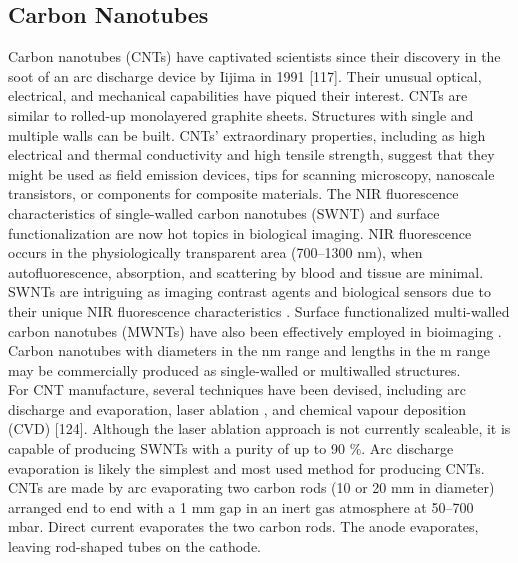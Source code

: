 \documentclass[12pt]{article}
\begin{document}
\subsection*{Carbon Nanotubes} 
Carbon nanotubes (CNTs) have captivated scientists since their discovery in the soot of an arc discharge device by Iijima in 1991 [117]. Their unusual optical, electrical, and mechanical capabilities have piqued their interest. CNTs are similar to rolled-up monolayered graphite sheets. Structures with single and multiple walls can be built. CNTs' extraordinary properties, including as high electrical and thermal conductivity and high tensile strength, suggest that they might be used as field emission devices, tips for scanning microscopy, nanoscale transistors, or components for composite materials. The NIR fluorescence characteristics of single-walled carbon nanotubes (SWNT) and surface functionalization are now hot topics in biological imaging. NIR fluorescence occurs in the physiologically transparent area (700–1300 nm), when autofluorescence, absorption, and scattering by blood and tissue are minimal. SWNTs are intriguing as imaging contrast agents  and biological sensors  due to their unique NIR fluorescence characteristics . Surface functionalized multi-walled carbon nanotubes (MWNTs) have also been effectively employed in bioimaging . Carbon nanotubes with diameters in the nm range and lengths in the m range may be commercially produced as single-walled or multiwalled structures.\\
For CNT manufacture, several techniques have been devised, including arc discharge and evaporation, laser ablation , and chemical vapour deposition (CVD) [124]. Although the laser ablation approach is not currently scaleable, it is capable of producing SWNTs with a purity of up to 90 $\%$. Arc discharge evaporation is likely the simplest and most used method for producing CNTs. CNTs are made by arc evaporating two carbon rods (10 or 20 mm in diameter) arranged end to end with a 1 mm gap in an inert gas atmosphere at 50–700 mbar. Direct current evaporates the two carbon rods.  The anode evaporates, leaving rod-shaped tubes on the cathode.
\end{document}
